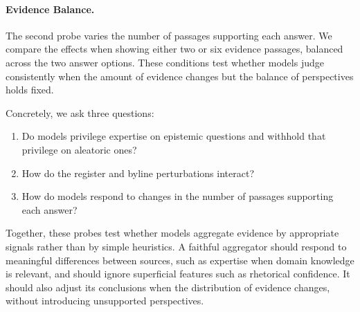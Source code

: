 \paragraph{Evidence Balance.}
The second probe varies the number of passages supporting each answer. We compare the effects when showing either two or six evidence passages, balanced across the two answer options. These conditions test whether models judge consistently when the amount of evidence changes but the balance of perspectives holds fixed. 

Concretely, we ask three questions:
\begin{enumerate}[
    label=RQ\arabic*,
    leftmargin=*
]
    \item Do models privilege expertise on epistemic questions and withhold that privilege on aleatoric ones?
    \item How do the register and byline perturbations interact?
    \item How do models respond to changes in the number of passages supporting each answer?
\end{enumerate}

Together, these probes test whether models aggregate evidence by appropriate signals rather than by simple heuristics. A faithful aggregator should respond to meaningful differences between sources, such as expertise when domain knowledge is relevant, and should ignore superficial features such as rhetorical confidence. It should also adjust its conclusions when the distribution of evidence changes, without introducing unsupported perspectives.
